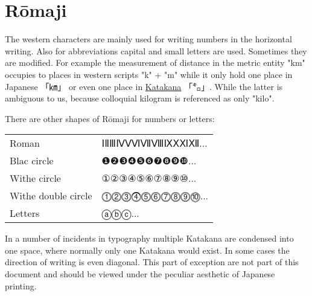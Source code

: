 \section{Rōmaji } \label{sec:Romaji}



The western characters are mainly used for writing numbers in the horizontal
writing. Also for abbreviations capital and small letters are used. Sometimes
they are modified. For example the measurement of distance in the metric entity
"km" occupies to places in western scripts "k" + "m" while it only hold one
place in Japanese {「㎞」} or even one place in
\hyperref[sec:Katakana]{Katakana}  {「㌔」}. While the latter is ambiguous to
us, because colloquial kilogram is referenced as only "kilo".


There are other shapes of Rōmaji for numbers or letters:


\begin{center}
\begin{tabular}{ll}
Roman       &ⅠⅡⅢⅣⅤⅥⅦⅧⅨⅩⅪⅫ...\\
Blac circle & ❶❷❸❹❺❻❼❽❾❿...\\
Withe circle &①②③④⑤⑥⑦⑧⑨⑩...\\
Withe double circle & ⓵⓶⓷⓸⓹⓺⓻⓼⓽⓾...\\
Letters             &ⓐⓑⓒ...\\
\end{tabular}
\end{center}
\newpage
{}

In a number of incidents in typography multiple Katakana are condensed
into one space, where normally only one Katakana would exist. In some cases the
direction of writing is even diagonal. This part of exception are not part of
this document and should be viewed under the peculiar aesthetic of Japanese
printing.

